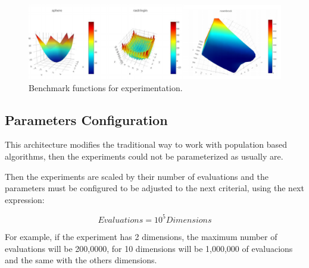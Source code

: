 \documentclass[runningheads]{llncs}
\begin{document}
\begin{figure}[htp]
    \includegraphics[width=\textwidth]{benchmark.png}
    \caption{Benchmark functions for experimentation.} \label{fig1}
    \end{figure}

\subsection{Parameters Configuration} 

This architecture modifies the traditional way to work with population based algorithms, then the experiments 
could not be parameterized as usually are.

Then the experiments are scaled by their number of evaluations and the
parameters must be configured to be adjusted to the next criterial, using the next expression:

\begin{equation}
    \label{eq:hesitancy-interpretation}
   Evaluations = 10^{5} Dimensions
   \end{equation}

For example, if the experiment has 2 dimensions, the maximum number of evaluations will be 200,0000, for 10 dimensions will be 1,000,000 of evaluacions and the same with the others dimensions.
\end{document}
